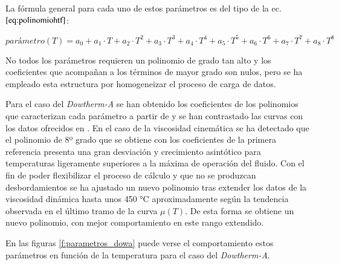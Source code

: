 La fórmula general para cada uno de estos parámetros es del tipo de la ec.\(\eqref{eq:polinomiohtf}\):

\begin{equation}
   parámetro(T) = a_0 + a_1 \cdot T + a_2 \cdot T^2 + a_3 \cdot T^3 + a_4 \cdot T^4 + a_5 \cdot T^5 + a_6 \cdot T^6 +  a_7 \cdot T^7 + a_8 \cdot T^8   
    \label{eq:polinomiohtf}
\end{equation}

No todos los parámetros requieren un polinomio de grado tan alto y los coeficientes que acompañan a los términos de mayor grado son nulos, pero se ha empleado esta estructura por homogeneizar el proceso de carga de datos.

Para el caso del \emph{Dowtherm-A} se han obtenido los coeficientes de los polinomios que caracterizan cada parámetro a partir de \cite{richardl.mooreImplementationDOWTHERMProperties2010} y se han contrastado las curvas con los datos ofrecidos en \cite{machadoProductTechnicalData}. En el caso de la viscosidad cinemática se ha detectado que el polinomio de 8º grado que se obtiene con los coeficientes de la primera referencia presenta una gran desviación y crecimiento asintótico para temperaturas ligeramente superiores a la máxima de operación del fluido. Con el fin de poder flexibilizar el proceso de cálculo y que no se produzcan desbordamientos se ha ajustado un nuevo polinomio tras extender los datos de la viscosidad dinámica hasta unos 450 °C aproximadamente según la tendencia observada en el último tramo de la curva \(\mu(T)\). De esta forma se obtiene un nuevo polinomio, con mejor comportamiento en este rango extendido.

En las figuras \ref{f:parametros_dowa} puede verse el comportamiento estos parámetros en función de la temperatura para el caso del \emph{Dowtherm-A}.

